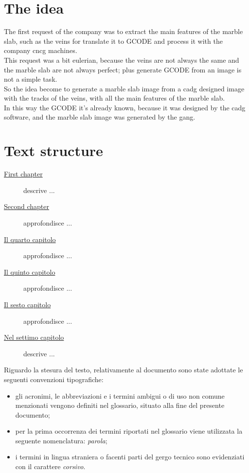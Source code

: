 \section{The idea}

The first request of the company was to extract the main features of the marble slab, such as the veins for translate it to GCODE and process it with the company \gls{cncg} machines.\\
This request was a bit eulerian, because the veins are not always the same and the marble slab are not always perfect; plus generate GCODE from an image is not a simple task.\\
So the idea become to generate a marble slab image from a \gls{cadg} designed image with the tracks of the veins, with all the main features of the marble slab.\\
In this way the GCODE it's already known, because it was designed by the \gls{cadg} software, and the marble slab image was generated by the \gls{gang}.\\

\section{Text structure}

\begin{description}
    \item[{\hyperref[cap:processi-metodologie]{First chapter}}] descrive ...
    
    \item[{\hyperref[cap:descrizione-stage]{Second chapter}}] approfondisce ...
    
    \item[{\hyperref[cap:analisi-requisiti]{Il quarto capitolo}}] approfondisce ...
    
    \item[{\hyperref[cap:progettazione-codifica]{Il quinto capitolo}}] approfondisce ...
    
    \item[{\hyperref[cap:verifica-validazione]{Il sesto capitolo}}] approfondisce ...
    
    \item[{\hyperref[cap:conclusioni]{Nel settimo capitolo}}] descrive ...
\end{description}

Riguardo la stesura del testo, relativamente al documento sono state adottate le seguenti convenzioni tipografiche:
\begin{itemize}
	\item gli acronimi, le abbreviazioni e i termini ambigui o di uso non comune menzionati vengono definiti nel glossario, situato alla fine del presente documento;
	\item per la prima occorrenza dei termini riportati nel glossario viene utilizzata la seguente nomenclatura: \emph{parola}\glsfirstoccur;
	\item i termini in lingua straniera o facenti parti del gergo tecnico sono evidenziati con il carattere \emph{corsivo}.
\end{itemize}
